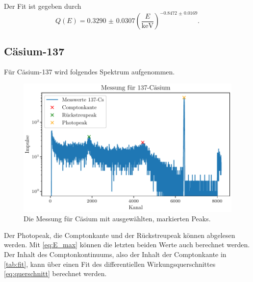 Der Fit ist gegeben durch
\begin{equation}
    Q(E) = \num{0.3290(307)} (\frac{E}{\si{\kilo\electronvolt}})^{\num{-0.8472(169)}}.
    \label{eq:fiteffizienz}
\end{equation}

\subsection{Cäsium-137}

Für Cäsium-137 wird folgendes Spektrum aufgenommen.

\begin{figure}[H]
    \centering
    \includegraphics[width=\textwidth]{plots/Caesium.pdf}
    \caption{Die Messung für Cäsium mit ausgewählten, markierten Peaks.}
    \label{fig:Cäsium}
\end{figure}

Der Photopeak, die Comptonkante und der Rückstreupeak können abgelesen werden. Mit \eqref{eq:E_max} können die letzten beiden Werte auch berechnet werden.
Der Inhalt des Comptonkontinuums, also der Inhalt der Comptonkante in \ref{tab:fit}, kann über einen Fit des differentiellen Wirkungsquerschnittes \eqref{eq:querschnitt} berechnet werden.


